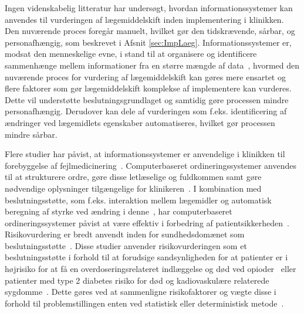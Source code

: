 Ingen videnskabelig litteratur har undersøgt, hvordan informationssystemer kan anvendes til vurderingen af lægemiddelskift inden implementering i klinikken. Den nuværende proces foregår manuelt, hvilket gør den tidskrævende, sårbar, og personafhængig, som beskrevet i Afsnit \ref{sec:ImpLaeg}. Informationssystemer er, modsat den menneskelige evne, i stand til at organisere og identificere sammenhænge mellem informationer fra en større mængde af data~\citep{Agrawal2009}, hvormed den nuværende proces for vurdering af lægemiddelskift kan gøres mere ensartet og flere faktorer som gør lægemiddelskift komplekse af implementere kan vurderes. Dette vil understøtte beslutningsgrundlaget og samtidig gøre processen mindre personafhængig. Derudover kan dele af vurderingen som f.eks. identificering af ændringer ved lægemidlets egenskaber automatiseres, hvilket gør processen mindre sårbar. 

Flere studier har påvist, at informationssystemer er anvendelige i klinikken til forebyggelse af fejlmedicinering~\citep{Agrawal2009, Kaushal2002, Stenner2010, Fischer2008, Simpson2008, Bates2000a}. Computerbaseret ordineringssystemer anvendes til at strukturere ordre, gøre disse letlæselige og fuldkommen samt gøre nødvendige oplysninger tilgængelige for klinikeren~\citep{Agrawal2009,Bates2000a}. I kombination med beslutningsstøtte, som f.eks. interaktion mellem lægemidler og automatisk beregning af styrke ved ændring i denne~\citep{Agrawal2009}, har computerbaseret ordineringssystemer påvist at være effektiv i forbedring af patientsikkerheden~\citep{Agrawal2009, Bates2000a}. Risikovurdering er bredt anvendt inden for sundhedsdomænet som beslutningsstøtte~\citep{Geissert2018, Rawshani2018}. Disse studier anvender risikovurderingen som et beslutningsstøtte i forhold til at forudsige sandsynligheden for at patienter er i højrisiko for at få en overdoseringsrelateret indlæggelse og død ved opioder~\citep{Geissert2018} eller patienter med type 2 diabetes risiko for død og kadiovaskulære relaterede sygdomme~\citep{Rawshani2018}. Dette gøres ved at sammenligne risikofaktorer og vægte disse i forhold til problemstillingen enten ved statistisk eller deterministisk metode~\citep{Boyko1990}.


